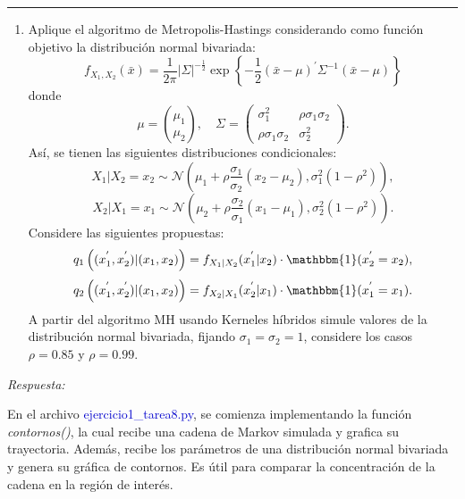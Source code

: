 \vspace{5mm}
{\color{lightgray} \hrule}
\begin{enumerate}
	\item Aplique el algoritmo de Metropolis-Hastings considerando como función objetivo la distribución normal bivariada:
	\begin{equation} \label{eq:1}
		f_{X_1,X_2} (\bar{x}) = \frac{1}{2\pi} \left| \Sigma \right|^{-\frac{1}{2}} \exp\left\{ -\frac{1}{2} (\bar{x} - \mu)^{'} \Sigma^{-1} (\bar{x} - \mu) \right\}
	\end{equation}
	donde
	\begin{equation} \label{eq:2}
		\mu = \binom{\mu_1}{\mu_2}, \quad \Sigma = 
		\begin{pmatrix}
			\sigma_{1}^2 & \rho\sigma_{1}\sigma_{2} \\
			\rho\sigma_{1}\sigma_{2} & \sigma_{2}^2
		\end{pmatrix}.
	\end{equation}
	Así, se tienen las siguientes distribuciones condicionales:
	\begin{equation} \label{eq:3}
		X_1 | X_2 = x_2 \sim \mathcal{N}\left( \mu_1 + \rho \frac{\sigma_{1}}{\sigma_{2}} (x_2 - \mu_2), \sigma_{1}^2 (1-\rho^2) \right),
	\end{equation}
	\begin{equation} \label{eq:4}
		X_2 | X_1 = x_1 \sim \mathcal{N}\left( \mu_2 + \rho \frac{\sigma_{2}}{\sigma_{1}} (x_1 - \mu_1), \sigma_{2}^2 (1-\rho^2) \right).
	\end{equation}
	Considere las siguientes propuestas:
	\begin{equation} \label{eq:5}
		q_{1} \left( (x_1^{'}, x_2^{'}) | (x_1, x_2) \right) = f_{X_1 | X_2} ( x_1^{'} | x_2 ) \cdot \mathbbm{1} (x_2^{'} = x_2),
	\end{equation}
	\begin{equation} \label{eq:6}
		q_{2} \left( (x_1^{'}, x_2^{'}) | (x_1, x_2) \right) = f_{X_2 | X_1} ( x_2^{'} | x_1 ) \cdot \mathbbm{1} (x_1^{'} = x_1).
	\end{equation}
	A partir del algoritmo MH usando Kerneles híbridos simule valores de la distribución normal bivariada, fijando $\sigma_{1} = \sigma_{2} = 1$, considere los casos $\rho = 0.85$ y $\rho =0.99$.
\end{enumerate}

\textcolor{BrickRed}{\it Respuesta:}

En el archivo \textcolor{mediumblue}{ejercicio1\_tarea8.py}, se comienza implementando la función \textit{contornos()}, la cual recibe una cadena de Markov simulada y grafica su trayectoria. Además, recibe los parámetros de una distribución normal bivariada y genera su gráfica de contornos. Es útil para comparar la concentración de la cadena en la región de interés.

